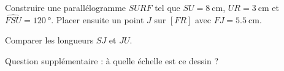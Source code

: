 
\begin{exercice}\label{exo2smath-0171}

    Construire une parallélogramme \( SURF\) tel que \( SU=\SI{8}{\centi\meter}\), \( UR=\SI{3}{\centi\meter}\) et \( \widehat{FSU}=\SI{120}{\degree}\). Placer ensuite un point \( J\) sur \( [FR]\) avec \( FJ=\SI{5.5}{\centi\meter}\).

    Comparer les longueurs \( SJ\) et \( JU\).

\begin{center}

\end{center}
Question supplémentaire : à quelle échelle est ce dessin ?

\end{exercice}
